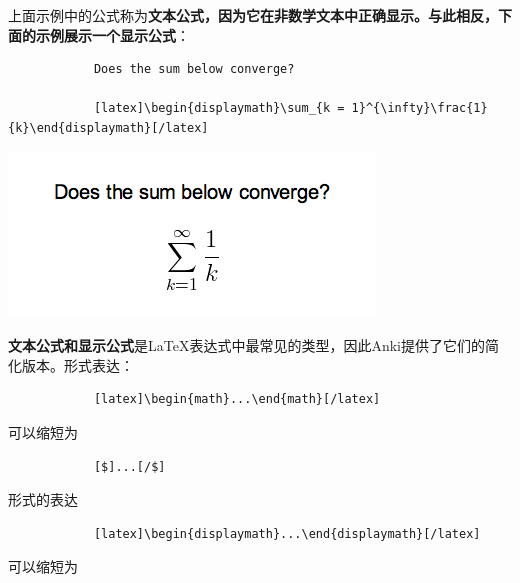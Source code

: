 \documentclass[a4paper]{book}
\begin{document}
		上面示例中的公式称为\textbf{文本公式，因为它在非数学文本中正确显示。与此相反，下面的示例展示一个显示公式}：
		
		\begin{shaded}\begin{verbatim}
			Does the sum below converge?
			
			[latex]\begin{displaymath}\sum_{k = 1}^{\infty}\frac{1}{k}\end{displaymath}[/latex]
			\end{verbatim}\end{shaded}
		
		\includegraphics{figures/convergence-question-2.png}
		
		\textbf{文本公式和显示公式}是\LaTeX{}表达式中最常见的类型，因此Anki提供了它们的简化版本。形式表达：
		
		\begin{shaded}\begin{verbatim}
			[latex]\begin{math}...\end{math}[/latex]
			\end{verbatim}\end{shaded}
		
		可以缩短为
		
		\begin{shaded}\begin{verbatim}
			[$]...[/$]
			\end{verbatim}\end{shaded}
		
		形式的表达
		
		\begin{shaded}\begin{verbatim}
			[latex]\begin{displaymath}...\end{displaymath}[/latex]
			\end{verbatim}\end{shaded}
		
		可以缩短为
		
\end{document}
